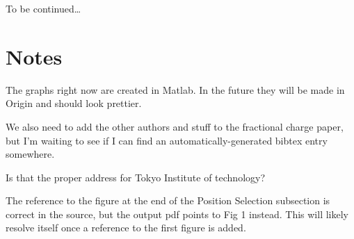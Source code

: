 \documentclass[superscriptaddress,aps,prb,11pt]{revtex4-1}
\begin{document}
\begin{acknowledgments}
To be continued\ldots
\end{acknowledgments}

\section{Notes}
The graphs right now are created in Matlab.  In the future they will be made in Origin and should look prettier.

We also need to add the other authors and stuff to the fractional charge paper, but I'm waiting to see if I can find an automatically-generated bibtex entry somewhere.

Is that the proper address for Tokyo Institute of technology?

The reference to the figure at the end of the Position Selection subsection is correct in the source, but the output pdf points to Fig 1 instead.  This will likely resolve itself once a reference to the first figure is added.

\nocite{fractionalcharge}


\end{document}
